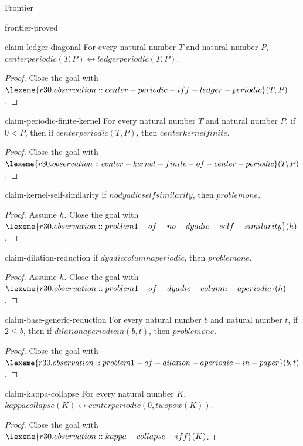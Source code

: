 \begin{lexlean}{Frontier}
\begin{section}{frontier-proved}
\begin{theorem}{claim-ledger-diagonal}
For every natural number \(T\) and natural number \(P\), \(centerperiodic(T, P) ↔ ledgerperiodic(T, P)\).
\begin{proof}
Close the goal with \(\lexeme{r30.observation::center-periodic-iff-ledger-periodic}(T, P)\).
\end{proof}
\end{theorem}

\begin{theorem}{claim-periodic-finite-kernel}
For every natural number \(T\) and natural number \(P\), if \(0 < P\), then if \(centerperiodic(T, P)\), then \(centerkernelfinite\).
\begin{proof}
Close the goal with \(\lexeme{r30.observation::center-kernel-finite-of-center-periodic}(T, P)\).
\end{proof}
\end{theorem}

\begin{theorem}{claim-kernel-self-similarity}
if \(nodyadicselfsimilarity\), then \(problemone\).
\begin{proof}
Assume \(h\).
Close the goal with \(\lexeme{r30.observation::problem1-of-no-dyadic-self-similarity}(h)\).
\end{proof}
\end{theorem}

\begin{theorem}{claim-dilation-reduction}
if \(dyadiccolumnaperiodic\), then \(problemone\).
\begin{proof}
Assume \(h\).
Close the goal with \(\lexeme{r30.observation::problem1-of-dyadic-column-aperiodic}(h)\).
\end{proof}
\end{theorem}

\begin{theorem}{claim-base-generic-reduction}
For every natural number \(b\) and natural number \(t\), if \(2 ≤ b\), then if \(dilationaperiodicin(b, t)\), then \(problemone\).
\begin{proof}
Close the goal with \(\lexeme{r30.observation::problem1-of-dilation-aperiodic-in-paper}(b, t)\).
\end{proof}
\end{theorem}

\begin{theorem}{claim-kappa-collapse}
For every natural number \(K\), \(kappacollapse(K) ↔ centerperiodic(0, twopow(K))\).
\begin{proof}
Close the goal with \(\lexeme{r30.observation::kappa-collapse-iff}(K)\).
\end{proof}
\end{theorem}


\end{section}
\end{lexlean}
